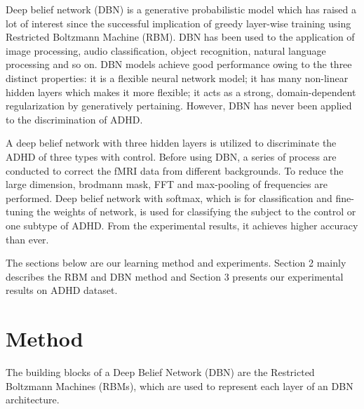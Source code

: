 \documentclass{llncs}
\begin{document}
Deep belief network (DBN) is a generative probabilistic model which has raised a lot of interest since the successful implication of greedy layer-wise training using Restricted Boltzmann Machine (RBM)\cite{9}\cite{10}\cite{11}. DBN has been used to the application of image processing\cite{9}, audio classification\cite{12}, object recognition\cite{13}\cite{14}, natural language processing\cite{15} and so on. DBN models achieve good performance owing to the three distinct properties: it is a flexible neural network model; it has many non-linear hidden layers which makes it more flexible; it acts as a strong, domain-dependent regularization by generatively pertaining. However, DBN has never been applied to the discrimination of ADHD.


A deep belief network with three hidden layers is utilized to discriminate the ADHD of three types with control. Before using DBN, a series of process are conducted to correct the fMRI data from different backgrounds. To reduce the large dimension, brodmann mask, FFT and max-pooling of frequencies are performed. Deep belief network with softmax, which is for classification and fine-tuning the weights of network, is used for classifying the subject to the control or one subtype of ADHD. From the experimental results, it achieves higher accuracy than ever.


The sections below are our learning method and experiments. Section 2 mainly describes the RBM and DBN method and Section 3 presents our experimental results on ADHD dataset.


\section{Method}
The building blocks of a Deep Belief Network (DBN) are the Restricted Boltzmann Machines (RBMs), which are used to represent each layer of an DBN architecture.

%
\end{document}
